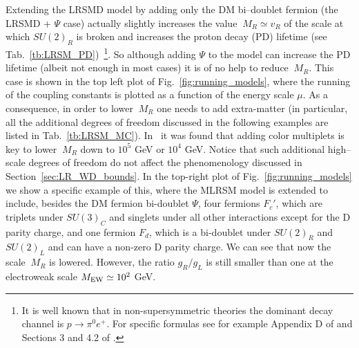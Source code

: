 \documentclass[11pt]{article}
\newcommand{\MR}{\:M_{R}}
\newcommand{\Figref}[1]{Fig.~\ref{#1}}
\newcommand{\Tabref}[1]{Tab.~\ref{#1}}
\begin{document}
Extending the LRSMD model by adding only the DM bi--doublet fermion (the LRSMD + $\Psi$ case) actually slightly increases the value $\MR\simeq v_R$ of the scale at which $SU(2)_R$ is broken and increases the proton decay (PD) lifetime (see \Tabref{tb:LRSM_PD})~\footnote{It is well known that in non-supersymmetric theories the dominant decay channel is $p\rightarrow \pi^0 e^+$. For specific formulas see for example Appendix D of \cite{Mambrini:2015vna} and Sections 3 and 4.2 of \cite{Chun:2021brv}.}. So although adding $\Psi$ to the model can increase the PD lifetime (albeit not enough in most cases) it is of no help to reduce $\MR$. This case is shown in the top left plot of \Figref{fig:running_models}, where the running of the coupling constants is plotted as a function of the energy scale $\mu$. As a consequence, in order to lower $\MR$ one needs to add extra-matter (in particular, all the additional degrees of freedom discussed in the following examples are listed in Tab.~\ref{tb:LRSM_MC}). In~\cite{Lindner:1996tf} it was found that adding color multiplets is  key to lower $\MR$ down to $10^5$ GeV or $10^4$ GeV. Notice that such additional high--scale degrees of freedom do not affect the phenomenology discussed in Section~\ref{sec:LR_WD_bounds}. In the top-right plot of Fig.~\ref{fig:running_models} we show a specific example of this, where the MLRSM model is extended to include, besides the DM fermion bi-doublet $\Psi$, four fermions  $F_c'$, which are triplets under $SU(3)_C$ and singlets under all other interactions except for the D parity charge, and one fermion $F_d$, which is a bi-doublet under $SU(2)_R$ and $SU(2)_L$ and can have a non-zero D parity charge. We can see that now the scale $\MR$ is lowered. However, the ratio $g_R/g_L$ is still smaller than one at the electroweak scale $M_{\rm EW}\simeq 10^2$ GeV. 
\end{document}
